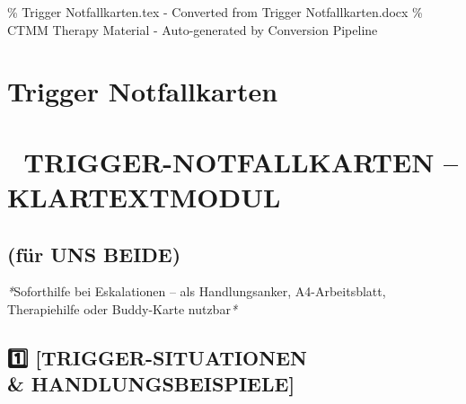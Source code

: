 \% Trigger Notfallkarten.tex - Converted from Trigger Notfallkarten.docx
\% CTMM Therapy Material - Auto-generated by Conversion Pipeline

\section{Trigger Notfallkarten}
\label{sec:trigger-notfallkarten}

\section{\textbf{🚨 TRIGGER-NOTFALLKARTEN -- KLARTEXTMODUL}}
\subsection{\textbf{(für UNS BEIDE)}}

\textcolor{ctmmBlue}{\faPuzzlePiece} \textit{*}Soforthilfe bei Eskalationen -- als Handlungsanker,
A4-Arbeitsblatt, Therapiehilfe oder Buddy-Karte nutzbar\textit{*}

\subsection{\textbf{1️⃣ [TRIGGER-SITUATIONEN \\& HANDLUNGSBEISPIELE]}}

